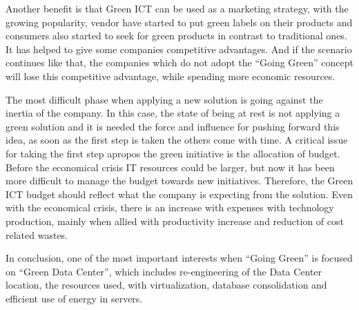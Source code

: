     Another benefit is that Green ICT can be used as a marketing strategy, with the growing popularity, vendor have started to put green labels on their products and consumers also started to seek for green products in contrast to traditional ones. It has helped to give some companies competitive advantages. And if the scenario continues like that, the companies which do not adopt the ``Going Green'' concept will lose this competitive advantage, while spending more economic resources.
    
    The most difficult phase when applying a new solution is going against the inertia of the company. In this case, the state of being at rest is not applying a green solution and it is needed the force and influence for pushing forward this idea, as soon as the first step is taken the others come with time. A critical issue for taking the first step apropos the green initiative is the allocation of budget. Before the economical crisis IT resources could be larger, but now it has been more difficult to manage the budget towards new initiatives. Therefore, the Green ICT budget should reflect what the company is expecting from the solution. Even with the economical crisis, there is an increase with expenses with technology production, mainly when allied with productivity increase and reduction of cost related wastes. 
    
    In conclusion, one of the most important interests when ``Going Green'' is focused on ``Green Data Center'', which includes re-engineering of the Data Center location, the resources used, with virtualization, database consolidation and efficient use of energy in servers. 




